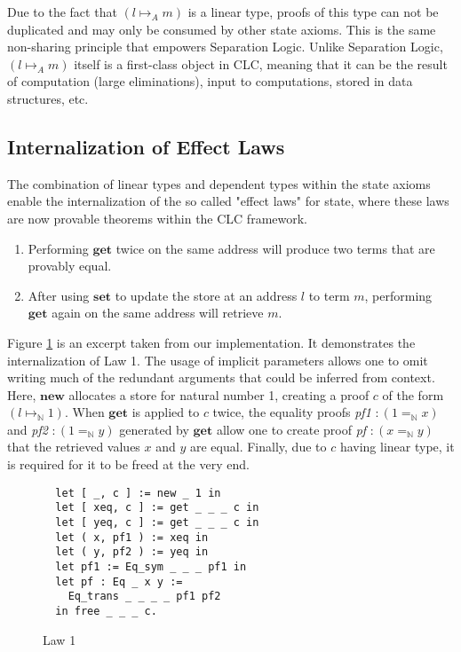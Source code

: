 \documentclass[sigplan,screen,review,authordraft]{acmart}
\theoremstyle{definition}
\newcommand{\new}{\textbf{new}}
\newcommand{\get}{\textbf{get}}
\newcommand{\set}{\textbf{set}}
\begin{document}
  Due to the fact that $(l \mapsto_A m)$ is a linear type, proofs of this type can not be duplicated and may only be consumed by other state axioms. This is the same non-sharing principle that empowers Separation Logic. Unlike Separation Logic, $(l \mapsto_A m)$ itself is a first-class object in CLC, meaning that it can be the result of computation (large eliminations), input to computations, stored in data structures, etc.

  \subsection{Internalization of Effect Laws}
  The combination of linear types and dependent types within the state axioms enable the internalization of the so called "effect laws" for state, where these laws are now provable theorems within the CLC framework.

  \begin{enumerate}
    \item Performing $\get$ twice on the same address will produce two terms that are provably equal.
    \item After using $\set$ to update the store at an address $l$ to term $m$, performing $\get$ again on the same address will retrieve $m$.
  \end{enumerate}

  Figure \ref{law1} is an excerpt taken from our implementation. It demonstrates the internalization of Law 1. The usage of implicit parameters allows one to omit writing much of the redundant arguments that could be inferred from context. Here, $\new$ allocates a store for natural number 1, creating a proof $c$ of the form $(l \mapsto_\mathbb{N} 1)$. When $\get$ is applied to $c$ twice, the equality proofs \textit{pf1} $: (1 =_\mathbb{N} x)$ and \textit{pf2} $: (1 =_\mathbb{N} y)$ generated by $\get$ allow one to create proof \textit{pf} $: (x =_\mathbb{N} y)$ that the retrieved values $x$ and $y$ are equal. Finally, due to $c$ having linear type, it is required for it to be freed at the very end.

  \begin{figure}[h]
  \vspace{-0.6em}
  \caption{Law 1}
  \begin{lstlisting}
  let [ _, c ] := new _ 1 in
  let [ xeq, c ] := get _ _ _ c in
  let [ yeq, c ] := get _ _ _ c in
  let ( x, pf1 ) := xeq in
  let ( y, pf2 ) := yeq in
  let pf1 := Eq_sym _ _ _ pf1 in
  let pf : Eq _ x y := 
    Eq_trans _ _ _ _ pf1 pf2 
  in free _ _ _ c.
  \end{lstlisting}
  \vspace{-0.6em}
  \label{law1}
  \Description{}
  \end{figure}
\end{document}
